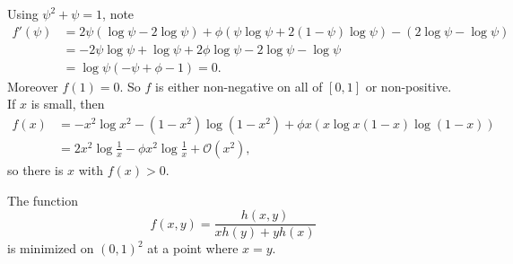 \documentclass[12pt]{article}
\begin{document}
\begin{proofbox}
	Using $\psi^2 + \psi = 1$, note
	\begin{align*}
		f'(\psi) &= 2 \psi(\log \psi - 2 \log \psi) + \phi (\psi \log \psi + 2 (1 - \psi) \log \psi) - (2 \log \psi - \log \psi) \\
			 &= - 2 \psi \log \psi + \log \psi + 2 \phi \log \psi - 2 \log \psi - \log \psi \\
			 &= \log \psi(- \psi + \phi - 1) = 0.
	\end{align*}
	Moreover $f(1) = 0$. So $f$ is either non-negative on all of $[0, 1]$ or non-positive. If $x$ is small, then
	\begin{align*}
		f(x) &= - x^2 \log x^2 - (1 - x^2) \log (1 - x^2) + \phi x (x \log x ( 1- x) \log (1 - x)) \\
		     &= 2 x^2 \log \frac{1}{x} - \phi x^2 \log \frac{1}{x} + \mathcal{O}(x^2),
	\end{align*}
	so there is $x$ with $f(x) > 0$.
\end{proofbox}

\begin{lemma}
	The function
	\[
	f(x, y) = \frac{h(x, y)}{x h(y) + y h(x)}
	\]
	is minimized on $(0, 1)^2$ at a point where $x = y$.
\end{lemma}
\end{document}
